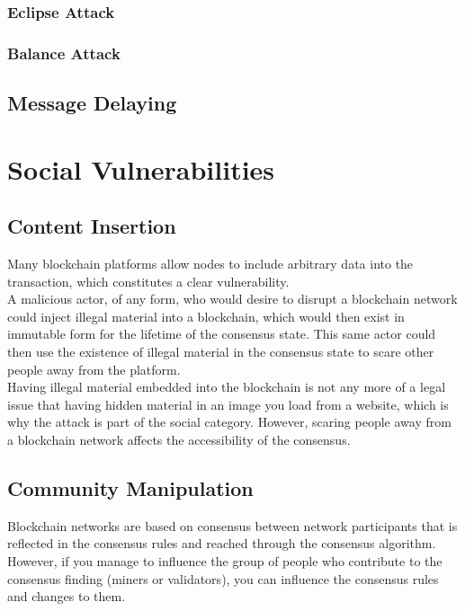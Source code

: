 \documentclass[11pt,a4paper]{article}
\begin{document}
\subsubsection{Eclipse Attack}

\subsubsection{Balance Attack}

\subsection{Message Delaying}

\section{Social Vulnerabilities}

\subsection{Content Insertion}

Many blockchain platforms allow nodes to include arbitrary data into the transaction, which constitutes a clear vulnerability.\\

A malicious actor, of any form, who would desire to disrupt a blockchain network could inject illegal material into a blockchain, which would then exist in immutable form for the lifetime of the consensus state. This same actor could then use the existence of illegal material in the consensus state to scare other people away from the platform.\\

Having illegal material embedded into the blockchain is not any more of a legal issue that having hidden material in an image you load from a website, which is why the attack is part of the social category. However, scaring people away from a blockchain network affects the accessibility of the consensus.\\

\subsection{Community Manipulation}

Blockchain networks are based on consensus between network participants that is reflected in the consensus rules and reached through the consensus algorithm. However, if you manage to influence the group of people who contribute to the consensus finding (miners or validators), you can influence the consensus rules and changes to them.\\
\end{document}

